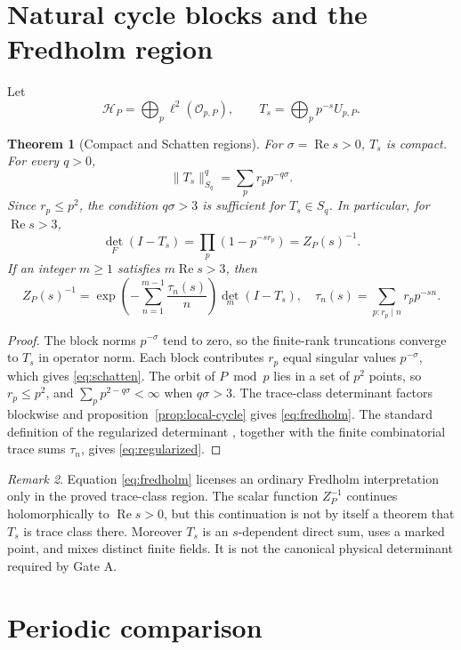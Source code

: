 \documentclass[11pt]{article}
\newtheorem{theorem}{Theorem}[section]
\theoremstyle{remark}
\newtheorem{remark}[theorem]{Remark}
\newcommand{\RePart}{\operatorname{Re}}
\newcommand{\cO}{\mathcal O}
\newcommand{\cH}{\mathcal H}
\begin{document}
\section{Natural cycle blocks and the Fredholm region}

Let
\[
 \cH_P=\bigoplus_p\ell^2(\cO_{p,P}),
 \qquad
 T_s=\bigoplus_p p^{-s}U_{p,P}.
\]

\begin{theorem}[Compact and Schatten regions]
\label{thm:operator}
For \(\sigma=\RePart s>0\), \(T_s\) is compact.  For every \(q>0\),
\[
 \|T_s\|_{S_q}^q=\sum_p r_p p^{-q\sigma}.
 \label{eq:schatten}
\]
Since \(r_p\le p^2\), the condition \(q\sigma>3\) is sufficient for
\(T_s\in S_q\).  In particular, for \(\RePart s>3\),
\[
 \det_F(I-T_s)=\prod_p(1-p^{-s r_p})=Z_P(s)^{-1}.
 \label{eq:fredholm}
\]
If an integer \(m\ge1\) satisfies \(m\RePart s>3\), then
\[
 Z_P(s)^{-1}
 =\exp\!\left(-\sum_{n=1}^{m-1}\frac{\tau_n(s)}n\right)
 \det_m(I-T_s),
 \quad
 \tau_n(s)=\sum_{p:r_p\mid n}r_p p^{-sn}.
 \label{eq:regularized}
\]
\end{theorem}

\begin{proof}
The block norms \(p^{-\sigma}\) tend to zero, so the finite-rank truncations
converge to \(T_s\) in operator norm.  Each block contributes \(r_p\) equal
singular values \(p^{-\sigma}\), which gives \eqref{eq:schatten}.  The orbit
of \(P\bmod p\) lies in a set of \(p^2\) points, so \(r_p\le p^2\), and
\(
\sum_p p^{2-q\sigma}<\infty
\)
when \(q\sigma>3\).  The trace-class determinant factors blockwise and
proposition~\ref{prop:local-cycle} gives \eqref{eq:fredholm}.  The standard
definition of the regularized determinant \citep{Simon2005}, together with
the finite combinatorial trace sums \(\tau_n\), gives
\eqref{eq:regularized}.
\end{proof}

\begin{remark}
Equation \eqref{eq:fredholm} licenses an ordinary Fredholm interpretation
only in the proved trace-class region.  The scalar function \(Z_P^{-1}\)
continues holomorphically to \(\RePart s>0\), but this continuation is not by
itself a theorem that \(T_s\) is trace class there.  Moreover \(T_s\) is an
\(s\)-dependent direct sum, uses a marked point, and mixes distinct finite
fields.  It is not the canonical physical determinant required by Gate A.
\end{remark}

\section{Periodic comparison}
\end{document}
